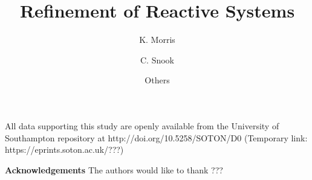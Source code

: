 \documentclass[runningheads,a4paper]{llncs}
\begin{document}
\title{Refinement of Reactive Systems} 


%
%
\author{K. Morris \and C. Snook \and Others}


%
\institute{
	Sandia, USA\\
	ECS, University of Southampton, U.K.\\
}


\maketitle















\vspace{-1 pt}

\begin{scriptsize}
	
	\par
	\noindent
	All data supporting this study are openly available from the University of Southampton repository at
	http://doi.org/10.5258/SOTON/D0 (Temporary link: https://eprints.soton.ac.uk/???)\\
	
	\par
	\noindent
	\textbf{Acknowledgements} The authors would like to thank ???
	
\end{scriptsize}




\end{document}
